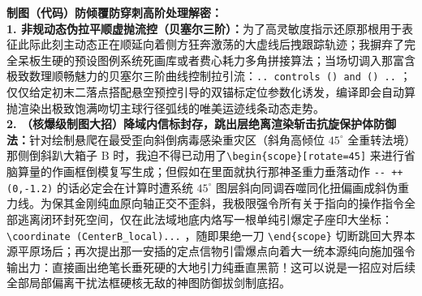 \vspace{0.6cm}

{\small\color{blue!70!black}
\textbf{制图（代码）防倾覆防穿刺高阶处理解密：}\\
\textbf{1. 非规动态伪拉平顺虚抛流控（贝塞尔三阶）：}为了高灵敏度指示还原那根用于表征此际此刻主动态正在顺延向着侧方狂奔激荡的大虚线后拽跟踪轨迹；我摒弃了完全呆板生硬的预设图例系统死画库或者费心耗力多角拼接算法；当场切调入那富含极致数理顺畅魅力的贝塞尔三阶曲线控制拉引流：\texttt{.. controls () and () ..} ；仅仅给定初末二落点搭配悬空预控引导的双锚标定位参数化诱发，编译即会自动算抛渲染出极致饱满吻切主球行径弧线的唯美运迹线条动态走势。\\
\textbf{2. （核爆级制图大招）降域内信标封存，跳出层绝离渲染斩击抗旋保护体防御法：}针对绘制悬爬在最受歪向斜倒病毒感染重灾区（斜角高倾位 $45^\circ$ 全重转法境）那侧倒斜趴大箱子 B 时，我迫不得已动用了\texttt{\textbackslash begin\{scope\}[rotate=45]} 来进行省脑算量的作画框倒模复写生成；但假如在里面就执行那神圣重力垂落动作 \texttt{-{}- ++(0,-1.2)} 的话必定会在计算时遭系统 $45^\circ$ 图层斜向同调吞噬同化扭偏画成斜伪重力线。为保其金刚纯血原向轴正交不歪斜，我极限强令所有关于指向的操作指令全部逃离闭环封死空间，仅在此法域地底内烙写一根单纯引爆定子座印大坐标：\texttt{\textbackslash coordinate (CenterB\_local)...} ，随即果绝一刀 \texttt{\textbackslash end\{scope\}} 切断跳回大界本源平原场后；再次提出那一安插的定点信物引雷爆点向着大一统本源纯向施加强令输出力：直接画出绝笔长垂死硬的大地引力纯垂直黑箭！这可以说是一招应对后续全部局部偏离干扰法框硬核无敌的神图防御拔剑制底招。
}

